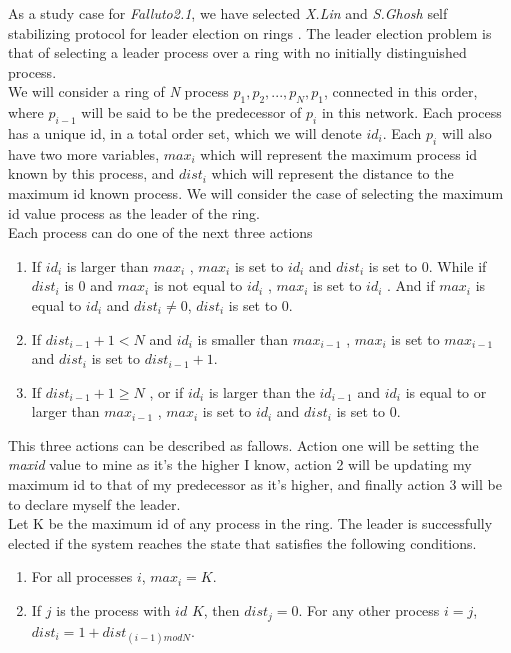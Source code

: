 \documentclass[12pt]{article}
\newcommand{\falluto}{\mbox{\textit{Falluto2.1}}}
\begin{document}
As a study case for \falluto, we have selected \textit{X.Lin} and \textit{S.Ghosh} self stabilizing protocol for leader election on rings \cite{linghosh, ghoshgupta, yokogawa, hammes}. The leader election problem is that of selecting a leader process over a ring with no initially distinguished process.\\
We will consider a ring of \textit{N} process $p_1,p_2,...,p_N,p_1$, connected in this order, where $p_{i-1}$ will be said to be the predecessor of $p_i$ in this network. Each process has a unique id, in a total order set, which we will denote $id_i$. Each $p_i$ will also have two more variables, $max_i$ which will represent the maximum process id known by this process, and $dist_i$ which will represent the distance to the maximum id known process. We will consider the case of selecting the maximum id value process as the leader of the ring.\\
Each process can do one of the next three actions
\begin{enumerate}
\item If $id_i$ is larger than $max_i$ , $max_i$ is set to $id_i$ and $dist_i$ is set to $0$. While if $dist_i$ is $0$ and $max_i$ is not equal to $id_i$ , $max_i$ is set to $id_i$ . And if $max_i$ is equal to $id_i$ and $dist_i \neq 0$, $dist_i$ is set to $0$.

\item If $dist_{i-1} + 1 < N$ and $id_i$ is smaller than $max_{i-1}$ , $max_i$ is set to $max_{i-1}$ and $dist_i$ is set to $dist_{i-1} + 1$.

\item If $dist_{i-1} + 1 \geq N$ , or if $id_i$ is larger than the $id_{i-1}$ and $id_i$ is equal to or larger than $max_{i-1}$ , $max_i$ is set to $id_i$ and $dist_i$ is set to $0$.
\end{enumerate}
This three actions can be described as fallows. Action one will be setting the \textit{maxid} value to mine as it's the higher I know, action 2 will be updating my maximum id to that of my predecessor as it's higher, and finally action 3 will be to declare myself the leader.\\
Let K be the maximum id of any process in the ring. The leader is successfully elected if the system reaches the state that satisfies the following conditions.
\begin{enumerate}
\item For all processes $i$, $max_i = K$.

\item If $j$ is the process with $id$ $K$, then $dist_j = 0$. For any other process $i = j$, $dist_i =
1 + dist_{(i-1) mod N}$.
\end{enumerate}
\end{document}
